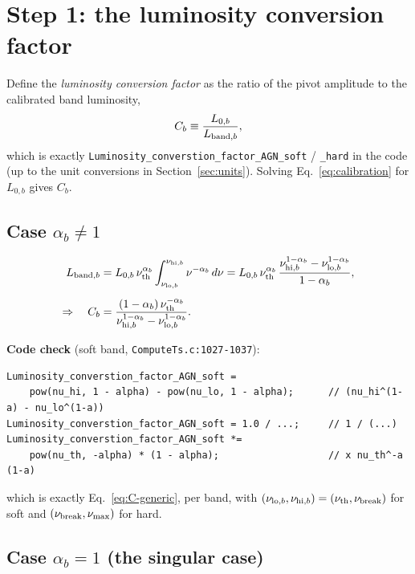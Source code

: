 \documentclass[11pt]{article}
\newcommand{\code}[1]{\texttt{#1}}
\begin{document}
\section{Step 1: the luminosity conversion factor}
\label{sec:conversion}

Define the \emph{luminosity conversion factor} as the ratio of the pivot
amplitude to the calibrated band luminosity,
\begin{equation}
  C_b \equiv \frac{L_{0,b}}{L_{{\rm band},b}},
\end{equation}
which is exactly \code{Luminosity\_converstion\_factor\_AGN\_soft} /
\code{\_hard} in the code (up to the unit conversions in
Section~\ref{sec:units}). Solving Eq.~\eqref{eq:calibration} for $L_{0,b}$
gives $C_b$.

\subsection{Case $\alpha_b \neq 1$}

\begin{align}
  L_{{\rm band},b} &= L_{0,b}\,\nu_{\rm th}^{\alpha_b}
     \int_{\nu_{{\rm lo},b}}^{\nu_{{\rm hi},b}} \nu^{-\alpha_b}\,d\nu
   = L_{0,b}\,\nu_{\rm th}^{\alpha_b}\,
     \frac{\nu_{{\rm hi},b}^{1-\alpha_b} - \nu_{{\rm lo},b}^{1-\alpha_b}}{1-\alpha_b}, \\[4pt]
  \Rightarrow\quad
  C_b &= \frac{(1-\alpha_b)\,\nu_{\rm th}^{-\alpha_b}}
              {\nu_{{\rm hi},b}^{1-\alpha_b} - \nu_{{\rm lo},b}^{1-\alpha_b}}.
  \label{eq:C-generic}
\end{align}

\noindent \textbf{Code check} (soft band, \code{ComputeTs.c:1027-1037}):
\begin{verbatim}
Luminosity_converstion_factor_AGN_soft =
    pow(nu_hi, 1 - alpha) - pow(nu_lo, 1 - alpha);      // (nu_hi^(1-a) - nu_lo^(1-a))
Luminosity_converstion_factor_AGN_soft = 1.0 / ...;     // 1 / (...)
Luminosity_converstion_factor_AGN_soft *=
    pow(nu_th, -alpha) * (1 - alpha);                   // x nu_th^-a (1-a)
\end{verbatim}
which is exactly Eq.~\eqref{eq:C-generic}, per band, with
$(\nu_{{\rm lo},b},\nu_{{\rm hi},b}) = (\nu_{\rm th},\nu_{\rm break})$ for soft
and $(\nu_{\rm break},\nu_{\rm max})$ for hard.

\subsection{Case $\alpha_b = 1$ (the singular case)}
\end{document}
